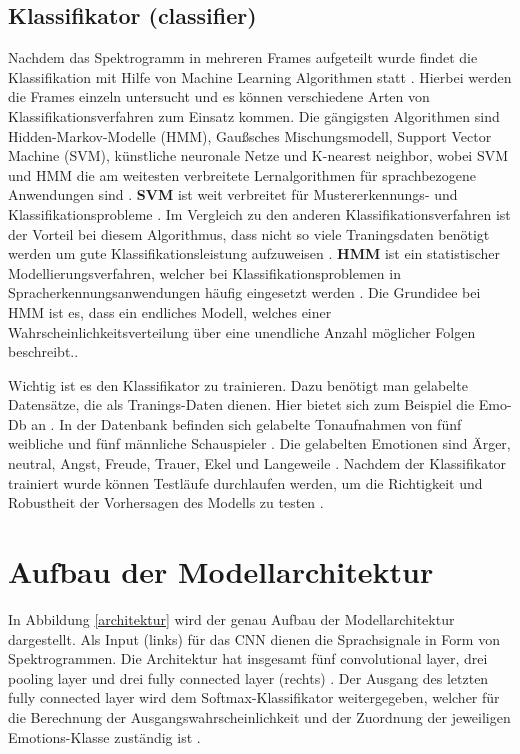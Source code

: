 \subsection{Klassifikator (classifier)}
Nachdem das Spektrogramm in mehreren Frames aufgeteilt wurde findet die Klassifikation mit Hilfe von Machine Learning Algorithmen statt \cite{badshah2019deep}. Hierbei werden die Frames einzeln untersucht und es können verschiedene Arten von Klassifikationsverfahren zum Einsatz kommen. Die gängigsten Algorithmen sind Hidden-Markov-Modelle (HMM), Gaußsches Mischungsmodell, Support Vector Machine (SVM), künstliche neuronale Netze und K-nearest neighbor, wobei SVM und HMM die am weitesten verbreitete Lernalgorithmen für sprachbezogene Anwendungen sind \cite{badshah2019deep}. \newline
\textbf{SVM} ist weit verbreitet für Mustererkennungs- und Klassifikationsprobleme \cite{svm}. Im Vergleich zu den anderen Klassifikationsverfahren ist der Vorteil bei diesem  Algorithmus, dass nicht so viele Traningsdaten benötigt werden um gute Klassifikationsleistung aufzuweisen \cite{svm}.
\newline
\textbf{HMM} ist ein statistischer Modellierungsverfahren, welcher bei Klassifikationsproblemen in Spracherkennungsanwendungen häufig eingesetzt werden \cite{HMM}. Die Grundidee bei HMM ist es, dass ein endliches Modell, welches einer Wahrscheinlichkeitsverteilung über eine unendliche Anzahl möglicher Folgen beschreibt.\cite{HMM}.

Wichtig ist es den Klassifikator zu trainieren. Dazu benötigt man gelabelte Datensätze, die als Tranings-Daten dienen. Hier bietet sich zum Beispiel die Emo-Db an \cite{burkhardt2005database}. In der Datenbank befinden sich gelabelte Tonaufnahmen von fünf weibliche und fünf männliche Schauspieler \cite{burkhardt2005database}. Die gelabelten Emotionen sind Ärger, neutral, Angst, Freude, Trauer, Ekel und Langeweile \cite{burkhardt2005database}. Nachdem der Klassifikator trainiert wurde können Testläufe durchlaufen werden, um die Richtigkeit und Robustheit der Vorhersagen des Modells zu testen \cite{elearning}.

\section{Aufbau der Modellarchitektur}
In Abbildung \ref{architektur} wird der genau Aufbau der Modellarchitektur dargestellt. Als Input (links) für das CNN dienen die Sprachsignale in Form von Spektrogrammen. Die Architektur hat insgesamt fünf convolutional layer, drei pooling layer und drei fully connected layer (rechts) \cite{badshah2019deep}. Der Ausgang des letzten fully connected layer wird dem Softmax-Klassifikator weitergegeben, welcher für die Berechnung der Ausgangswahrscheinlichkeit und der Zuordnung der jeweiligen Emotions-Klasse zuständig ist \cite{badshah2019deep}. 


